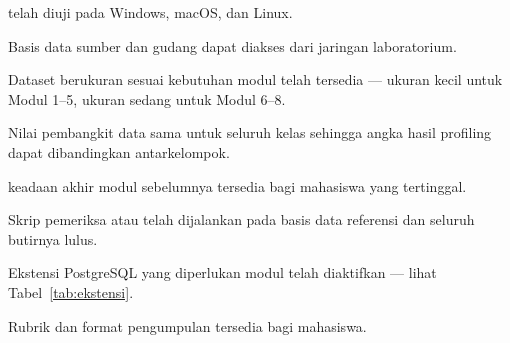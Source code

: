 \begin{ceklis}
  \item {} telah diuji pada Windows, macOS, dan Linux.
  \item Basis data sumber dan gudang dapat diakses dari jaringan laboratorium.
  \item Dataset berukuran sesuai kebutuhan modul telah tersedia --- ukuran
        kecil untuk Modul 1--5, ukuran sedang untuk Modul 6--8.
  \item Nilai  pembangkit data sama untuk seluruh kelas
        sehingga angka hasil profiling dapat dibandingkan antarkelompok.
  \item {} keadaan akhir modul sebelumnya tersedia bagi
        mahasiswa yang tertinggal.
  \item Skrip pemeriksa  atau  telah
        dijalankan pada basis data referensi dan seluruh butirnya lulus.
  \item Ekstensi PostgreSQL yang diperlukan modul telah diaktifkan --- lihat
        Tabel~\ref{tab:ekstensi}.
  \item Rubrik dan format pengumpulan tersedia bagi mahasiswa.
\end{ceklis}
